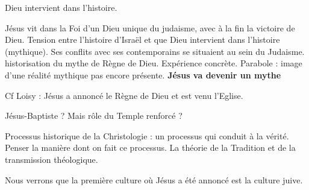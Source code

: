 \begin{Def}[mythe]
Dieu intervient dans l'histoire.
\end{Def}
\begin{Synthesis}
Jésus vit dans la Foi d'un Dieu unique du judaisme, avec à la fin la victoire de Dieu. Tension entre l'histoire d'Israël et que Dieu intervient dans l'histoire (mythique). Ses conflits avec ses contemporains se situaient au sein du Judaisme. 
historisation du mythe de Règne de Dieu. Expérience concrète. Parabole : image d'une réalité mythique pas encore présente. 
\textbf{Jésus va devenir un mythe}
\end{Synthesis}

Cf Loisy : Jésus a annoncé le Règne de Dieu et est venu l'Eglise. 

Jésus-Baptiste ? Mais rôle du Temple renforcé ? 

\begin{Synthesis}
Processus historique de la Christologie : un processus qui conduit à la vérité. Penser la manière dont on fait ce processus. La théorie de la Tradition et de la transmission théologique. 
\end{Synthesis}
Nous verrons que la première culture où Jésus a été annoncé est la culture juive.


